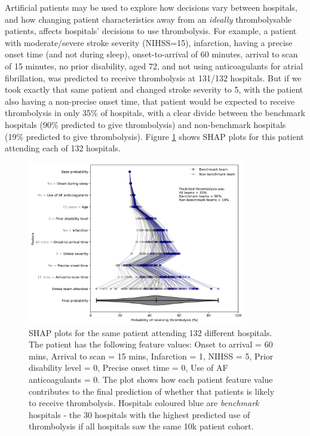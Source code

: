 Artificial patients may be used to explore how decisions vary between hospitals, and how changing patient characteristics away from an \emph{ideally} thrombolysable patients, affects hospitals' decisions to use thrombolysis. For example, a patient with moderate/severe stroke severity (NIHSS=15), infarction, having a precise onset time (and not during sleep), onset-to-arrival of 60 minutes, arrival to scan of 15 minutes, no prior disability, aged 72, and not using anticoagulants for atrial fibrillation, was predicted to receive thrombolysis at 131/132 hospitals. But if we took exactly that same patient and changed stroke severity to 5, with the patient also having a non-precise onset time, that patient would be expected to receive thrombolysis in only 35\% of hospitals, with a clear divide between the benchmark hospitals (90\% predicted to give thrombolysis) and non-benchmark hospitals (19\% predicted to give thrombolysis). Figure \ref{fig:results_artifical_shap_waterfall_with_violin} shows SHAP  plots for this patient attending each of 132 hospitals.

\begin{figure}
\centering
\includegraphics[width=0.85\textwidth]{./images/21_shap_waterfall_with_violin_contentious}
\caption{SHAP plots for the same patient attending 132 different hospitals. The patient has the following feature values: Onset to arrival = 60 mins, Arrival to scan = 15 mins, Infarction = 1, NIHSS = 5, Prior disability level = 0, Precise onset time = 0, Use of AF anticoagulants = 0. The plot shows how each patient feature value contributes to the final prediction of whether that patients is likely to receive thrombolysis. Hospitals coloured blue are \emph{benchmark} hospitals - the 30 hospitals with the highest predicted use of thrombolysis if all hospitals saw the same 10k patient cohort.}
\label{fig:results_artifical_shap_waterfall_with_violin}
\end{figure}








